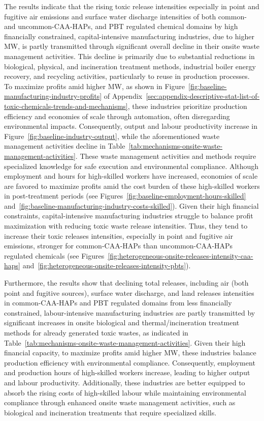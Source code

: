 \documentclass[12pt, english]{article}
\begin{document}
    The results indicate that the rising toxic release intensities especially in point and fugitive air emissions and surface water discharge intensities of both common- and uncommon-CAA-HAPs, and PBT regulated chemical domains by high financially constrained, capital-intensive manufacturing industries, due to higher MW, is partly transmitted through significant overall decline in their onsite waste management activities. This decline is primarily due to substantial reductions in biological, physical, and incineration treatment methods, industrial boiler energy recovery, and recycling activities, particularly to reuse in production processes. To maximize profits amid higher MW, as shown in Figure~\ref{fig:baseline-manufacturing-industry-profits} of Appendix~\ref{sec:appendix-descriptive-stat-list-of-toxic-chemicals-trends-and-mechanisms}, these industries prioritize production efficiency and economies of scale through automation, often disregarding environmental impacts. Consequently, output and labour productivity increase in Figure~\ref{fig:baseline-industry-output}, while the aforementioned waste management activities decline in Table~\ref{tab:mechanisms-onsite-waste-management-activities}. These waste management activities and methods require specialized knowledge for safe execution and environmental compliance. Although employment and hours for high-skilled workers have increased, economies of scale are favored to maximize profits amid the cost burden of these high-skilled workers in post-treatment periods (see Figures~\ref{fig:baseline-employment-hours-skilled} and~\ref{fig:baseline-manufacturing-industry-costs-skilled}). Given their high financial constraints, capital-intensive manufacturing industries struggle to balance profit maximization with reducing toxic waste release intensities. Thus, they tend to increase their toxic releases intensities, especially in point and fugitive air emissions, stronger for common-CAA-HAPs than uncommon-CAA-HAPs regulated chemicals (see Figures~\ref{fig:heterogeneous-onsite-releases-intensity-caa-haps} and~\ref{fig:heterogeneous-onsite-releases-intensity-pbts}).

    Furthermore, the results show that declining total releases, including air (both point and fugitive sources), surface water discharge, and land releases intensities in common-CAA-HAPs and PBT regulated domains from less financially constrained, labour-intensive manufacturing industries are partly transmitted by significant increases in onsite biological and thermal/incineration treatment methods for already generated toxic wastes, as indicated in Table~\ref{tab:mechanisms-onsite-waste-management-activities}. Given their high financial capacity, to maximize profits amid higher MW, these industries balance production efficiency with environmental compliance. Consequently, employment and production hours of high-skilled workers increase, leading to higher output and labour productivity. Additionally, these industries are better equipped to absorb the rising costs of high-skilled labour while maintaining environmental compliance through enhanced onsite waste management activities, such as biological and incineration treatments that require specialized skills.
\end{document}
